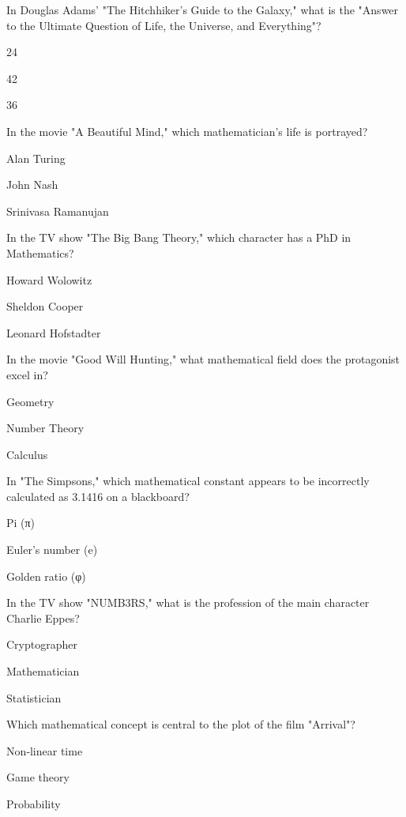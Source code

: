 
\begin{enhancedmcq}{In Douglas Adams' "The Hitchhiker's Guide to the Galaxy," what is the "Answer to the Ultimate Question of Life, the Universe, and Everything"?}
\item 24
\item 42
\item 36

\end{enhancedmcq}
\begin{enhancedmcq}{In the movie "A Beautiful Mind," which mathematician's life is portrayed?}
\item Alan Turing
\item John Nash
\item Srinivasa Ramanujan

\end{enhancedmcq}
\begin{enhancedmcq}{In the TV show "The Big Bang Theory," which character has a PhD in Mathematics?}
\item Howard Wolowitz
\item Sheldon Cooper
\item Leonard Hofstadter

\end{enhancedmcq}
\begin{enhancedmcq}{In the movie "Good Will Hunting," what mathematical field does the protagonist excel in?}
\item Geometry
\item Number Theory
\item Calculus

\end{enhancedmcq}
\begin{enhancedmcq}{In "The Simpsons," which mathematical constant appears to be incorrectly calculated as 3.1416 on a blackboard?}
\item Pi (π)
\item Euler's number (e)
\item Golden ratio (φ)

\end{enhancedmcq}
\begin{enhancedmcq}{In the TV show "NUMB3RS," what is the profession of the main character Charlie Eppes?}
\item Cryptographer
\item Mathematician
\item Statistician

\end{enhancedmcq}
\begin{enhancedmcq}{Which mathematical concept is central to the plot of the film "Arrival"?}
\item Non‑linear time
\item Game theory
\item Probability

\end{enhancedmcq}
